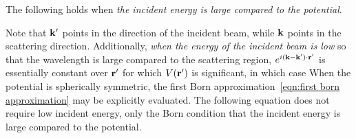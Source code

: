 The following holds when \textit{the incident energy is large compared to the potential}. 
\begin{mdframed}\end{mdframed}
Note that $\mathbf k'$ points in the direction of the incident beam, 
while $\mathbf k$ points in the scattering direction. 
Additionally, \textit{when the energy of the incident beam is low} 
so that the wavelength is large compared to the 
scattering region, $e^{i\mathbf{(k-k')\cdot r'}}$ is essentially constant over $\mathbf r'$ 
for which $V(\mathbf r')$ is significant, in which case 
When the potential is spherically symmetric, the first 
Born approximation~\ref{eqn:first born approximation}
may be explicitly evaluated. The following equation does not require low incident energy, 
only the Born condition that the incident energy is large compared to the potential. 
\begin{mdframed}
\end{mdframed}